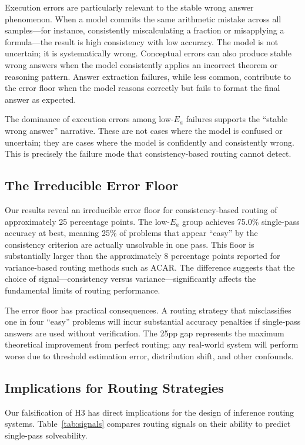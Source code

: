\documentclass{article}
\begin{document}
Execution errors are particularly relevant to the stable wrong answer phenomenon. When a model commits the same arithmetic mistake across all samples---for instance, consistently miscalculating a fraction or misapplying a formula---the result is high consistency with low accuracy. The model is not uncertain; it is systematically wrong. Conceptual errors can also produce stable wrong answers when the model consistently applies an incorrect theorem or reasoning pattern. Answer extraction failures, while less common, contribute to the error floor when the model reasons correctly but fails to format the final answer as expected.

The dominance of execution errors among low-$E_a$ failures supports the ``stable wrong answer'' narrative. These are not cases where the model is confused or uncertain; they are cases where the model is confidently and consistently wrong. This is precisely the failure mode that consistency-based routing cannot detect.

\subsection{The Irreducible Error Floor}

Our results reveal an irreducible error floor for consistency-based routing of approximately 25 percentage points. The low-$E_a$ group achieves 75.0\% single-pass accuracy at best, meaning 25\% of problems that appear ``easy'' by the consistency criterion are actually unsolvable in one pass. This floor is substantially larger than the approximately 8 percentage points reported for variance-based routing methods such as ACAR. The difference suggests that the choice of signal---consistency versus variance---significantly affects the fundamental limits of routing performance.

The error floor has practical consequences. A routing strategy that misclassifies one in four ``easy'' problems will incur substantial accuracy penalties if single-pass answers are used without verification. The 25pp gap represents the maximum theoretical improvement from perfect routing; any real-world system will perform worse due to threshold estimation error, distribution shift, and other confounds.

\subsection{Implications for Routing Strategies}

Our falsification of H3 has direct implications for the design of inference routing systems. Table~\ref{tab:signals} compares routing signals on their ability to predict single-pass solveability.
\end{document}
